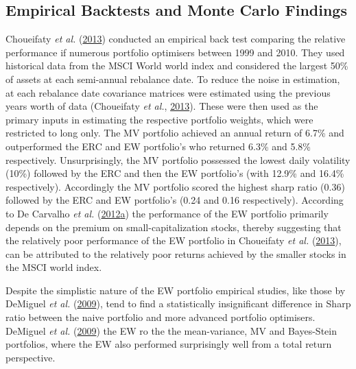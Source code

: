 \documentclass[11pt,preprint, authoryear]{elsarticle}
\numberwithin{equation}{section}
\numberwithin{figure}{section}
\numberwithin{table}{section}
\begin{document}
\hypertarget{empirical-backtests-and-monte-carlo-findings}{%
\subsection{Empirical Backtests and Monte Carlo
Findings}\label{empirical-backtests-and-monte-carlo-findings}}

Choueifaty \emph{et al.} (\protect\hyperlink{ref-choueifaty2013}{2013})
conducted an empirical back test comparing the relative performance if
numerous portfolio optimisers between 1999 and 2010. They used
historical data from the MSCI World world index and considered the
largest 50\% of assets at each semi-annual rebalance date. To reduce the
noise in estimation, at each rebalance date covariance matrices were
estimated using the previous years worth of data (Choueifaty \emph{et
al.}, \protect\hyperlink{ref-choueifaty2013}{2013}). These were then
used as the primary inputs in estimating the respective portfolio
weights, which were restricted to long only. The MV portfolio achieved
an annual return of 6.7\% and outperformed the ERC and EW portfolio's
who returned 6.3\% and 5.8\% respectively. Unsurprisingly, the MV
portfolio possessed the lowest daily volatility (10\%) followed by the
ERC and then the EW portfolio's (with 12.9\% and 16.4\% respectively).
Accordingly the MV portfolio scored the highest sharp ratio (0.36)
followed by the ERC and EW portfolio's (0.24 and 0.16 respectively).
According to De Carvalho \emph{et al.}
(\protect\hyperlink{ref-leote}{2012}\protect\hyperlink{ref-leote}{a})
the performance of the EW portfolio primarily depends on the premium on
small-capitalization stocks, thereby suggesting that the relatively poor
performance of the EW portfolio in Choueifaty \emph{et al.}
(\protect\hyperlink{ref-choueifaty2013}{2013}), can be attributed to the
relatively poor returns achieved by the smaller stocks in the MSCI world
index.

Despite the simplistic nature of the EW portfolio empirical studies,
like those by DeMiguel \emph{et al.}
(\protect\hyperlink{ref-demiguel2009}{2009}), tend to find a
statistically insignificant difference in Sharp ratio between the naive
portfolio and more advanced portfolio optimisers. DeMiguel \emph{et al.}
(\protect\hyperlink{ref-demiguel2009}{2009}) the EW ro the the
mean-variance, MV and Bayes-Stein portfolios, where the EW also
performed surprisingly well from a total return perspective.
\end{document}

